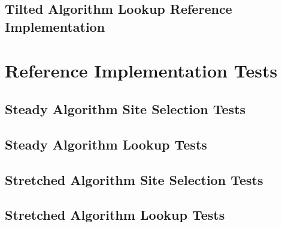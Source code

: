 

\subsection{Tilted Algorithm Lookup Reference Implementation}




\section{Reference Implementation Tests}

\subsection{Steady Algorithm Site Selection Tests}



\subsection{Steady Algorithm Lookup Tests}



\subsection{Stretched Algorithm Site Selection Tests}



\subsection{Stretched Algorithm Lookup Tests}


